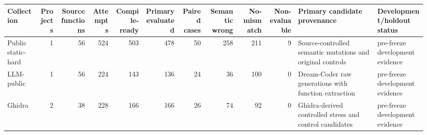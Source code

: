 \begin{tabular}{lrrrrrrrrrll}
\toprule
Collection & Projects & Source functions & Attempts & Compile-ready & Primary evaluated & Paired cases & Semantic wrong & No-mismatch & Non-evaluable & Primary candidate provenance & Development/holdout status \\
\midrule
Public static-hard & 1 & 56 & 524 & 503 & 478 & 50 & 258 & 211 & 9 & Source-controlled semantic mutations and original controls & pre-freeze development evidence \\
LLM-public & 1 & 56 & 224 & 143 & 136 & 24 & 36 & 100 & 0 & Dream-Coder raw generations with function extraction & pre-freeze development evidence \\
Ghidra & 2 & 38 & 228 & 166 & 166 & 26 & 74 & 92 & 0 & Ghidra-derived controlled stress and control candidates & pre-freeze development evidence \\
\bottomrule
\end{tabular}

